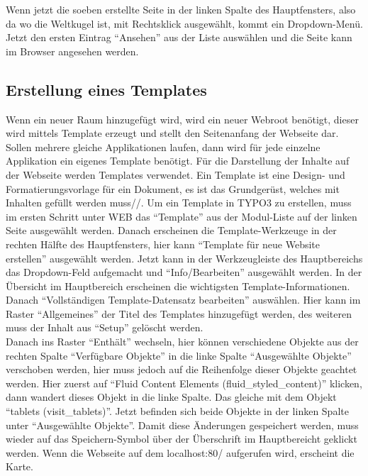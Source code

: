Wenn jetzt die soeben erstellte Seite in der linken Spalte des Hauptfensters, also da wo die Weltkugel ist, mit Rechtsklick ausgewählt, kommt ein Dropdown-Menü. Jetzt den ersten Eintrag “Ansehen” aus der Liste auswählen und die Seite kann im Browser angesehen werden.

\subsection{Erstellung eines Templates}

Wenn ein neuer Raum hinzugefügt wird, wird ein neuer Webroot benötigt, dieser wird mittels Template erzeugt und stellt den Seitenanfang der Webseite dar. Sollen mehrere gleiche Applikationen laufen, dann wird für jede einzelne Applikation ein eigenes Template benötigt.
Für die Darstellung der Inhalte auf der Webseite werden Templates verwendet. Ein Template ist eine Design- und Formatierungsvorlage für ein Dokument, es ist das Grundgerüst, welches mit Inhalten gefüllt werden muss//.
Um ein Template in TYPO3 zu erstellen, muss im ersten Schritt unter WEB das “Template” aus der Modul-Liste auf der linken Seite ausgewählt werden. Danach erscheinen die Template-Werkzeuge in der rechten Hälfte des Hauptfensters, hier kann “Template für neue Website erstellen” ausgewählt werden. Jetzt kann in der Werkzeugleiste des Hauptbereichs das Dropdown-Feld aufgemacht und “Info/Bearbeiten” ausgewählt werden. In der Übersicht im Hauptbereich erscheinen die wichtigsten Template-Informationen. Danach “Vollständigen Template-Datensatz bearbeiten” auswählen. Hier kann im Raster “Allgemeines” der Titel des Templates hinzugefügt werden, des weiteren muss der Inhalt aus “Setup” gelöscht werden.\\
Danach ins Raster “Enthält” wechseln, hier können verschiedene Objekte aus der rechten Spalte “Verfügbare Objekte” in die linke Spalte “Ausgewählte Objekte” verschoben werden, hier muss jedoch auf die Reihenfolge dieser Objekte geachtet werden. Hier zuerst auf “Fluid Content Elements (fluid\_styled\_content)” klicken, dann wandert dieses Objekt in die linke Spalte. Das gleiche mit dem Objekt “tablets (visit\_tablets)”. Jetzt befinden sich beide Objekte in der linken Spalte unter “Ausgewählte Objekte”. Damit diese Änderungen gespeichert werden, muss wieder auf das Speichern-Symbol über der Überschrift im Hauptbereicht geklickt werden. Wenn die Webseite auf dem localhost:80/ aufgerufen wird, erscheint die Karte.





